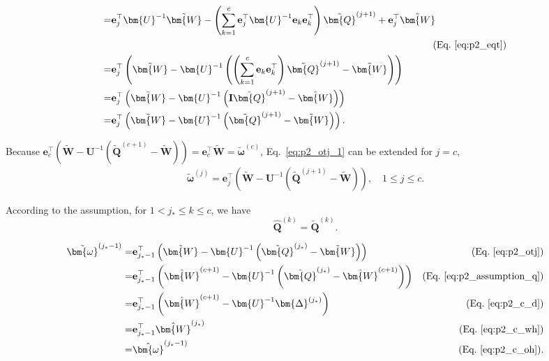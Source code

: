 \documentclass{article} %
\begin{document}
\begin{equation}
\begin{aligned}
= & \mathbf{e}_{j}^\top \bm{U}^{-1} \tilde{\bm{W}} - \left( \sum_{k=1}^{c} \mathbf{e}_{j}^\top \bm{U}^{-1} \mathbf{e}_{k} \mathbf{e}_{k}^\top \right) \tilde{\bm{Q}}^{(j+1)} + \mathbf{e}_{j}^\top \tilde{\bm{W}} \\
& \quad\quad\quad\quad\quad\quad\quad\quad\quad\quad\quad\quad\quad\quad\quad\quad\quad\quad\quad\quad\quad\quad\quad\quad\quad\quad\quad\quad\quad\quad\quad\quad\quad \text{(Eq.~\ref{eq:p2_eqt})} \\
= & \mathbf{e}_{j}^\top \left( \tilde{\bm{W}} - \bm{U}^{-1} \left( \left( \sum_{k=1}^{c} \mathbf{e}_{k} \mathbf{e}_{k}^\top \right) \tilde{\bm{Q}}^{(j+1)} - \tilde{\bm{W}} \right) \right) \\
= & \mathbf{e}_{j}^\top \left( \tilde{\bm{W}} - \bm{U}^{-1} \left( \mathbf{I} \tilde{\bm{Q}}^{(j+1)} - \tilde{\bm{W}} \right) \right) \\
= & \mathbf{e}_{j}^\top \left( \tilde{\bm{W}} - \bm{U}^{-1} \left( \tilde{\bm{Q}}^{(j+1)} - \tilde{\bm{W}} \right) \right) .
\end{aligned}
\label{eq:p2_otj_1}
\end{equation}

Because $\mathbf{e}_{c}^\top \left( \tilde{\bm{W}} - \bm{U}^{-1} \left( \tilde{\bm{Q}}^{(c+1)} - \tilde{\bm{W}} \right) \right) = \mathbf{e}_{c}^\top \tilde{\bm{W}} = \tilde{\bm{\omega}}^{(c)}$, Eq.~\ref{eq:p2_otj_1} can be extended for $j = c$,
\begin{equation}
\begin{aligned}
\tilde{\bm{\omega}}^{(j)} = \mathbf{e}_{j}^\top \left( \tilde{\bm{W}} - \bm{U}^{-1} \left( \tilde{\bm{Q}}^{(j+1)} - \tilde{\bm{W}} \right) \right), \quad 1 \le j \le c .
\end{aligned}
\label{eq:p2_otj}
\end{equation}

According to the assumption, for $1 < j_* \le k \le c$, we have
\begin{equation}
\hat{\bm{Q}}^{(k)} = \tilde{\bm{Q}}^{(k)} .
\label{eq:p2_assumption_q}
\end{equation}

\begin{equation}
\begin{aligned}
\tilde{\bm{\omega}}^{(j_*-1)}
= & \mathbf{e}_{j_*-1}^\top \left( \tilde{\bm{W}} - \bm{U}^{-1} \left( \tilde{\bm{Q}}^{(j_*)} - \tilde{\bm{W}} \right) \right) & \text{(Eq.~\ref{eq:p2_otj})} \\
= & \mathbf{e}_{j_*-1}^\top \left( \hat{\bm{W}}^{(c+1)} - \bm{U}^{-1} \left( \hat{\bm{Q}}^{(j_*)} - \hat{\bm{W}}^{(c+1)} \right) \right) & \text{(Eq.~\ref{eq:p2_assumption_q})} \\
= & \mathbf{e}_{j_*-1}^\top \left( \hat{\bm{W}}^{(c+1)} - \bm{U}^{-1} \bm{\Delta}^{(j_*)} \right) & \text{(Eq.~\ref{eq:p2_c_d})} \\
= & \mathbf{e}_{j_*-1}^\top \hat{\bm{W}}^{(j_*)} & \text{(Eq.~\ref{eq:p2_c_wh})} \\
= & \hat{\bm{\omega}}^{(j_*-1)} & \text{(Eq.~\ref{eq:p2_c_oh})} .
\end{aligned}
\end{equation}
\end{document}
